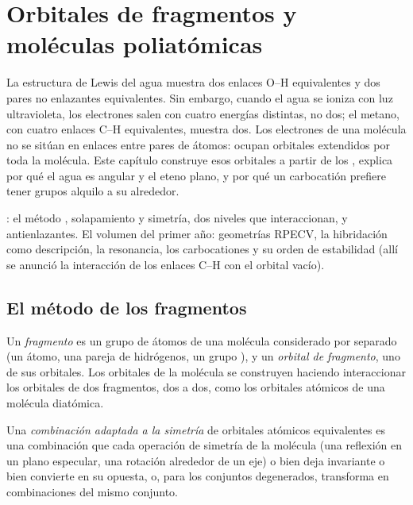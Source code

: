 \chapter{Orbitales de fragmentos y moléculas poliatómicas}\label{ch:b2:fragment-orbitals}

La estructura de Lewis del agua muestra dos enlaces O--H equivalentes y dos
pares no enlazantes equivalentes. Sin embargo, cuando el agua se ioniza con luz ultravioleta, los
electrones salen con cuatro energías distintas, no dos; el metano, con cuatro
enlaces C--H equivalentes, muestra dos. Los electrones de una molécula no se sitúan en enlaces
entre pares de átomos: ocupan orbitales extendidos por toda la molécula.
Este capítulo construye esos orbitales a partir de los , explica
por qué el agua es angular y el eteno plano, y por qué un carbocatión prefiere tener
grupos alquilo a su alrededor.

\begin{recall}
: el método , solapamiento y simetría, dos niveles que interaccionan,
 y antienlazantes. El volumen del primer año: geometrías RPECV, la hibridación
como descripción, la resonancia, los carbocationes y su orden de estabilidad (allí se anunció la
interacción de los enlaces C--H con el orbital vacío).
\end{recall}

\section{El método de los fragmentos}

\begin{definition}[Fragmentos]\label{def:b2:fragment-orbitals:fragment}
Un \emph{fragmento} es un grupo de átomos de una molécula considerado
por separado (un átomo, una pareja de hidrógenos, un grupo ), y un \emph{orbital de
fragmento}, uno de sus orbitales. Los orbitales de la
molécula se construyen haciendo interaccionar los orbitales de dos fragmentos, dos a
dos, como los orbitales atómicos de una molécula diatómica.
\end{definition}

\begin{definition}\label{def:b2:fragment-orbitals:symmetry-adapted}
Una \emph{combinación adaptada a la simetría} de
orbitales atómicos equivalentes es una combinación que cada operación de simetría de la
molécula (una reflexión en un plano especular, una rotación alrededor de un eje) o bien
deja invariante o bien convierte en su opuesta, o, para los conjuntos degenerados, transforma
en combinaciones del mismo conjunto.
\end{definition}

